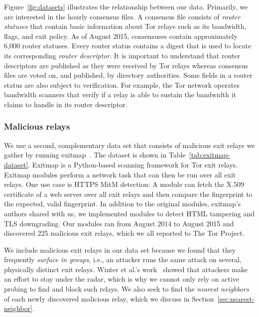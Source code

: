 Figure~\ref{fig:datasets} illustrates the relationship between our data.
Primarily, we are interested in the hourly consensus files.  A consensus file
consists of \emph{router statuses} that contain basic information about Tor
relays such as its bandwidth, flags, and exit policy.  As of August 2015,
consensuses contain approximately 6,000 router statuses.  Every router status
contains a digest that is used to locate its corresponding \emph{router
descriptor}.  It is important to understand that router descriptors are
published as they were received by Tor relays whereas consensus files are voted
on, and published, by directory authorities.  Some fields in a router status
are also subject to verification.  For example, the Tor network operates
bandwidth scanners that verify if a relay is able to sustain the bandwidth it
claims to handle in its router descriptor.

\subsubsection{Malicious relays}
We use a second, complementary data set that consists of malicious exit relays
we gather by running exitmap~\cite[\S 3.1]{Winter2014a}.  The dataset is shown
in Table~\ref{tab:exitmap-dataset}.  Exitmap is a Python-based scanning
framework for Tor exit relays.  Exitmap modules perform a network task that can
then be run over all exit relays.  One use case is HTTPS MitM detection: A
module can fetch the X.509 certificate of a web server over all exit relays and
then compare the fingerprint to the expected, valid fingerprint.  In addition to
the original modules, exitmap's authors shared with us, we implemented modules
to detect HTML tampering and TLS downgrading.  Our modules ran from August 2014
to August 2015 and discovered 225 malicious exit relays, which we all reported
to The Tor Project.

We include malicious exit relays in our data set because we found that they
frequently \emph{surface in groups}, i.e., an attacker runs the same attack on
several, physically distinct exit relays.  Winter et al.'s work~\cite[\S
5.2]{Winter2014a} showed that attackers make an effort to stay under the radar,
which is why we cannot only rely on active probing to find and block such
relays.  We also seek to find the \emph{nearest neighbors} of each newly
discovered malicious relay, which we discuss in
Section~\ref{sec:nearest-neighbor}.

